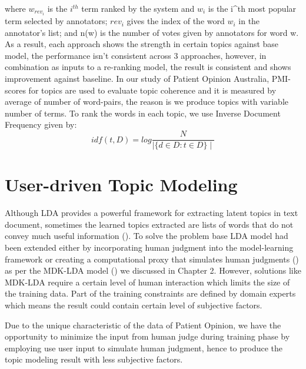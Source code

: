 \documentclass[11pt,twoside]{report}
\begin{document}
where $w_{rev_{i}}$ is the $i^{th}$ term ranked by the system and $w_i$ is the i^{th} most popular term selected by annotators; $rev_{i}$ gives the index of the word $w_i$ in the annotator's list; and n(w) is the number of votes given by annotators for word w. As a result, each approach shows the strength in certain topics against base model, the performance isn't consistent across 3 approaches, however, in combination as inputs to a re-ranking model, the result is consistent and shows improvement against baseline. In our study of Patient Opinion Australia, PMI-scores for topics are used to evaluate topic coherence and it is measured by average of number of word-pairs, the reason is we produce topics with variable number of terms. To rank the words in each topic, we use Inverse Document Frequency given by:
\begin{equation}
idf(t, D) = log\frac{N}{\mid \{d\in D : t\in D\}\mid}
\end{equation}

\chapter{User-driven Topic Modeling}

Although LDA provides a powerful framework for extracting latent topics in text document, sometimes the learned topics extracted are lists of words that do not convey much useful information (\cite{ref26}). To solve the problem base LDA model had been extended either by incorporating human judgment into the model-learning framework or creating a computational proxy that simulates human judgments (\cite{ref28}) as per the MDK-LDA model (\cite{ref24}) we discussed in Chapter 2. However, solutions like MDK-LDA require a certain level of human interaction which limits the size of the training data. Part of the training constraints are defined by domain experts which means the result could contain certain level of subjective factors.

Due to the unique characteristic of the data of Patient Opinion, we have the opportunity to minimize the input from human judge during training phase by employing use user input to simulate human judgment, hence to produce the topic modeling result with less subjective factors.

\end{document}
